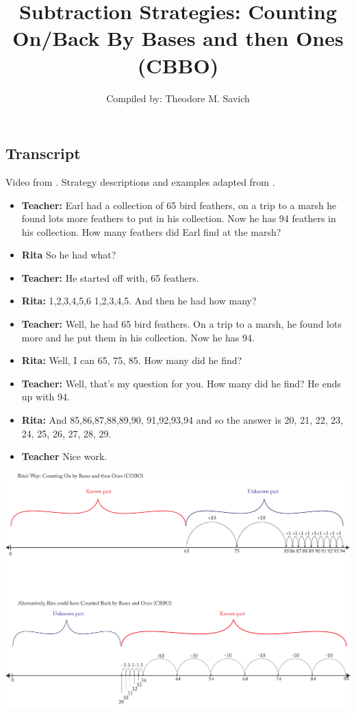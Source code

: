\documentclass[11pt]{article}
\title{Subtraction Strategies: Counting On/Back By Bases and then Ones (CBBO)}
\author{Compiled by: Theodore M. Savich}
\begin{document}
\maketitle
\subsection*{Transcript}
Video from \textcite{Carpenter1999}. Strategy descriptions and examples adapted from \textcite{HackenbergCourseNotes}. 
\begin{itemize}
\item \textbf{Teacher:} Earl had a collection of 65 bird feathers, on a trip to a marsh he found lots more feathers to put in his collection. Now he has 94 feathers in his collection. How many feathers did Earl find at the marsh? 
\item \textbf{Rita} So he had what? 
\item \textbf{Teacher:} He started off with, 65 feathers. 
\item \textbf{Rita:} 1,2,3,4,5,6 1,2,3,4,5. And then he had how many? 
\item \textbf{Teacher:} Well, he had 65 bird feathers. On a trip to a marsh, he found lots more and he put them in his collection. Now he has 94. 
\item \textbf{Rita:} Well, I can 65, 75, 85. How many did he find? 
\item \textbf{Teacher:} Well, that's my question for you. How many did he find? He ends up with 94. 
\item \textbf{Rita:} And 85,86,87,88,89,90, 91,92,93,94 and so the answer is 20, 21, 22, 23, 24, 25, 26, 27, 28, 29. 
\item \textbf{Teacher} Nice work.

\end{itemize}

\includegraphics[width=.8\textwidth]{images/Easy_Pictures/SAR_SUB_COBO/PDF/SAR_SUB_COBO_CBBO.pdf}
\end{document}
